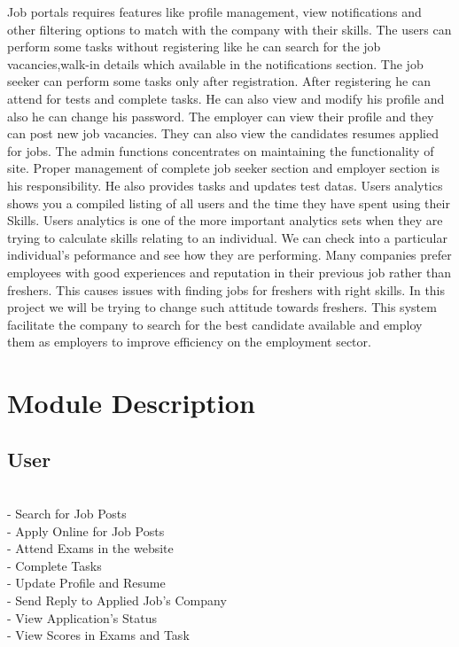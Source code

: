 \documentclass[a4paper,12pt]{report}
\begin{document}
Job portals requires features like profile management, view notifications and other filtering options to match with the company with their skills. The users can perform some tasks without registering like he can search for the job vacancies,walk-in details which available in the notifications section. The job seeker can perform some tasks only after registration. After registering he can attend for tests and complete tasks. He can also view and modify his profile and also he can change his password. The employer can view their profile and they can post new job vacancies. They can also view the candidates resumes applied for jobs. The admin functions concentrates on maintaining the functionality of site. Proper management of complete job seeker section and employer section is his responsibility. He also provides tasks and updates test datas. Users analytics shows you a compiled listing of all users and the time they have spent using their Skills. Users analytics is one of the more important analytics sets when they are trying to calculate skills relating to an individual. We can check into a particular individual's peformance and see how they are performing. Many companies prefer employees with good experiences and reputation in their previous job rather than freshers. This causes issues with finding jobs for freshers with right skills. In this project we will be trying to change such attitude towards freshers. This system facilitate the company to search for the best candidate available and employ them as employers to improve efficiency on the employment sector.\\

\pagebreak

\section{Module Description}
\subsection{User}

\subitem
\\ - Search for Job Posts
\\ - Apply Online for Job Posts
\\ - Attend Exams in the website
\\ - Complete Tasks
\\ - Update Profile and Resume
\\ - Send Reply to Applied Job's Company
\\ - View Application's Status
\\ - View Scores in Exams and Task
\end{document}
